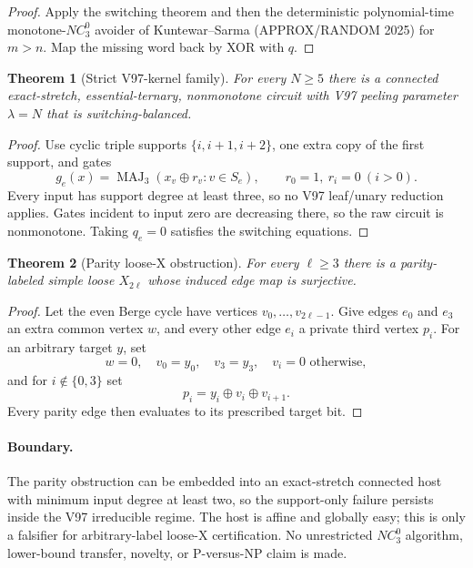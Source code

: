 \documentclass[11pt]{article}
\newtheorem{theorem}{Theorem}
\begin{document}
\begin{proof}
Apply the switching theorem and then the deterministic polynomial-time
monotone-$NC^0_3$ avoider of Kuntewar--Sarma (APPROX/RANDOM 2025) for $m>n$.
Map the missing word back by XOR with $q$.
\end{proof}

\begin{theorem}[Strict V97-kernel family]
For every $N\ge 5$ there is a connected exact-stretch, essential-ternary,
nonmonotone circuit with V97 peeling parameter $\lambda=N$ that is
switching-balanced.
\end{theorem}

\begin{proof}
Use cyclic triple supports $\{i,i+1,i+2\}$, one extra copy of the first support,
and gates
\[
g_e(x)=\operatorname{MAJ}_3(x_v\oplus r_v:v\in S_e),
\qquad r_0=1,\ r_i=0\ (i>0).
\]
Every input has support degree at least three, so no V97 leaf/unary reduction
applies. Gates incident to input zero are decreasing there, so the raw circuit
is nonmonotone. Taking $q_e=0$ satisfies the switching equations.
\end{proof}

\begin{theorem}[Parity loose-X obstruction]
For every $\ell\ge3$ there is a parity-labeled simple loose $X_{2\ell}$ whose
induced edge map is surjective.
\end{theorem}

\begin{proof}
Let the even Berge cycle have vertices $v_0,\ldots,v_{2\ell-1}$. Give edges
$e_0$ and $e_3$ an extra common vertex $w$, and every other edge $e_i$ a private
third vertex $p_i$. For an arbitrary target $y$, set
\[
w=0,\quad v_0=y_0,\quad v_3=y_3,\quad v_i=0\text{ otherwise},
\]
and for $i\notin\{0,3\}$ set
\[
p_i=y_i\oplus v_i\oplus v_{i+1}.
\]
Every parity edge then evaluates to its prescribed target bit.
\end{proof}

\paragraph{Boundary.}
The parity obstruction can be embedded into an exact-stretch connected host
with minimum input degree at least two, so the support-only failure persists
inside the V97 irreducible regime. The host is affine and globally easy; this
is only a falsifier for arbitrary-label loose-X certification. No unrestricted
$NC^0_3$ algorithm, lower-bound transfer, novelty, or P-versus-NP claim is made.
\end{document}
